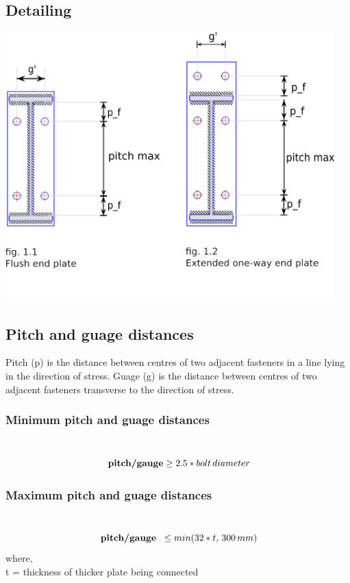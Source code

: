 \documentclass[11.5pt,a4paper,oneside]{report}
\begin{document}
\begin{Form}
\chapter{Detailing}
	{\centering
	\includegraphics[width=5in]{svg_drawingFPEOW.png} \\}

\section{Pitch and guage distances}
	Pitch (p) is the distance between centres of two adjacent fasteners in a line lying in the direction of stress.
	Guage (g) is the distance between centres of two adjacent fasteners transverse to the direction of stress.

\subsection{Minimum pitch and guage distances}
	\indent [Reference: Cl. 10.2.2, IS 800 : 2007]\\
		\begin{equation}
			 \textbf{\,pitch/gauge} \ge 2.5 * bolt\, diameter
		\end{equation}
				
\subsection{Maximum pitch and guage distances}
\indent [Reference: Cl. 10.2.3, IS 800 : 2007]\\				
		\begin{equation}
			\textbf{\,pitch/gauge \,} \leq min(32 * t,\, 300\, mm)
		\end{equation}
		where, \\
			\qquad t = thickness of thicker plate being connected 


\end{Form}
\end{document}
